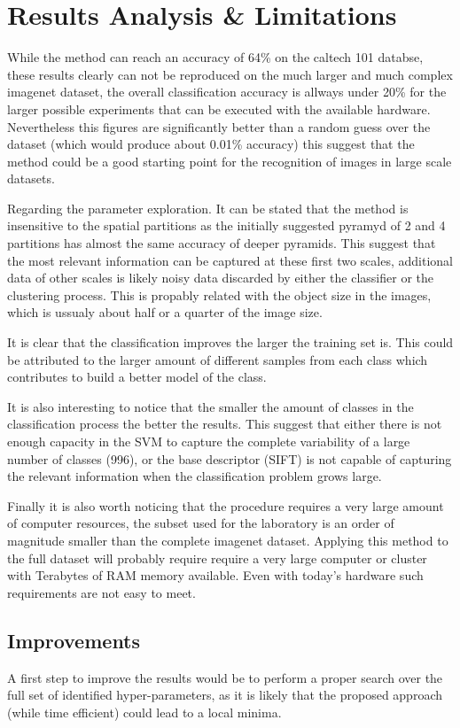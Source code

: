 \documentclass[10pt,twocolumn,letterpaper]{article}
\begin{document}
\section{Results Analysis \& Limitations}

While the method can reach an accuracy of 64\% on the caltech 101 databse, these results clearly can not be reproduced on the much larger and much complex imagenet dataset, the overall classification accuracy is allways under 20\% for the larger possible experiments that can be executed with the available hardware. Nevertheless this figures are significantly better than a random guess over the dataset (which would produce about 0.01\% accuracy) this suggest that the method could be a good starting point for the recognition of images in large scale datasets.

Regarding the parameter exploration. It can be stated that the method is insensitive to the spatial partitions as the initially suggested pyramyd of 2 and 4 partitions has almost the same accuracy of deeper pyramids. This suggest that the most relevant information can be captured at these first two scales, additional data of other scales is likely noisy data discarded by either the classifier or the clustering process. This is propably related with the object size in the images, which is ussualy about half or a quarter of the image size.

It is clear that the classification improves the larger the training set is. This could be attributed to the larger amount of different samples from each class which contributes to build a better model of the class.

It is  also interesting to notice that the smaller the amount of classes in the classification process the better the results. This suggest that either there is not enough capacity in the SVM to capture the complete variability of a large number of classes (996), or the base descriptor (SIFT) is not capable of capturing the relevant information when the classification problem grows large.

Finally it is also worth noticing that the procedure requires a very large amount of computer resources, the subset used for the laboratory is an order of magnitude smaller than the complete imagenet dataset. Applying this method to the full dataset will probably require require a very large computer or cluster with Terabytes of RAM memory available. Even with today's hardware such requirements are not easy to meet.

\subsection{Improvements}
A first step to improve the results would be to perform a proper search over the full set of identified hyper-parameters, as it is likely that the proposed approach (while time efficient) could lead to a local minima. 
\end{document}

